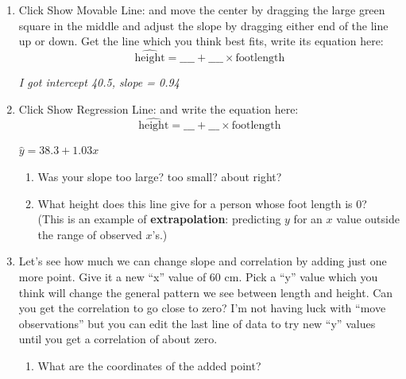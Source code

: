 \begin{enumerate}
\item Click {\sf Show Movable Line:} \fbox{$\surd$} and move the
  center by dragging the large green square in the middle and adjust
  the slope by dragging either end of the line up or down.  Get the
  line which you think best fits, write its equation here:
  $$ \widehat{\mbox{height}} = \_\_\_\_ + \_\_\_\_ \times \mbox{footlength}$$
\begin{students}
 \vspace{.2cm}      
\end{students}

\begin{key}
  {\it I got intercept 40.5, slope = 0.94}
\end{key}
\item Click {\sf Show Regression Line:} \fbox{$\surd$} and write the
  equation here:
  $$ \widehat{\mbox{height}} = \_\_\_ + \_\_\_ \times
  \mbox{footlength}$$
\begin{key}
  {\it $ \widehat{y} = 38.3 + 1.03 x$}
\end{key}
\begin{enumerate}
  \item Was your slope too large? too small? about right? 

  \item What height does this line give for a person whose foot length
    is 0?\vspace{.9cm}\\

    (This is an example of {\bf extrapolation}: predicting $y$ for an $x$ value
    outside the range of observed $x$'s.)
\end{enumerate}


\item  Let's see how much we can change slope and correlation by
  adding just one more point.  Give it a new ``x''  value of 60 cm.
  Pick a ``y'' value which you think will change the general pattern
  we see between length and height. Can you get the correlation to go
  close to zero?  I'm not having luck with ``move observations'' but
  you can edit the last line of data to try  new ``y'' values  until
  you get a correlation of about zero.  
  \begin{enumerate}
  \item 
  What are the coordinates of
  the added point?
\begin{students}
 \vspace{1cm}      
\end{students}


\end{enumerate}
\end{enumerate}
